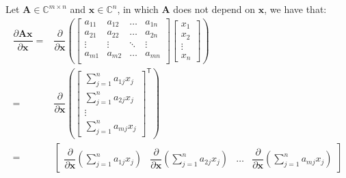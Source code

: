 \documentclass{article}
\newcommand{\trans}{\mathsf{T}}
\begin{document}
Let \(\mathbf{A}\in \mathbb{C}^{m\times n}\) and \(\mathbf{x} \in \mathbb{C}^{n}\), in which \(\mathbf{A}\) does not depend on \(\mathbf{x}\), we have that:
\begin{align}
    \dfrac{\partial \mathbf{A} \mathbf{x}}{\partial \mathbf{x}} = & \dfrac{\partial}{\partial \mathbf{x}} \left(
        \begin{bmatrix}
            a_{11} & a_{12} & \dots & a_{1n} \\
            a_{21} & a_{22} & \dots & a_{2n} \\
            \vdots & \vdots & \ddots & \vdots \\
            a_{m1} & a_{m2} & \dots & a_{mn} \\
        \end{bmatrix} \begin{bmatrix}
            x_{1} \\ x_{2} \\ \vdots \\ x_{n}
        \end{bmatrix} \right)  \\
    = & \dfrac{\partial}{\partial \mathbf{x}} \left(\begin{bmatrix} 
        \sum_{j = 1}^n a_{1j}x_j \\
        \sum_{j = 1}^n a_{2j}x_j \\
        \vdots \\
        \sum_{j = 1}^n a_{mj}x_j
    \end{bmatrix}^\trans \right)  \\
    = & \begin{bmatrix} 
        \dfrac{\partial}{\partial \mathbf{x}}\left(\sum_{j = 1}^n {a_{1j}x_j}\right) & \dfrac{\partial}{\partial \mathbf{x}}\left(\sum_{j = 1}^n {a_{2j}x_j}\right) & \dots & \dfrac{\partial}{\partial \mathbf{x}}\left(\sum_{j = 1}^n {a_{mj}x_j}\right)
    \end{bmatrix}
\end{align}
\end{document}
